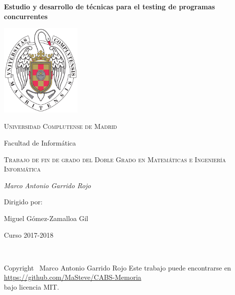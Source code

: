 \begin{titlepage}
  \centering
  \vspace{5cm}
  {\huge\bfseries Estudio y desarrollo de técnicas para el testing de programas concurrentes\par}
  \vspace{2cm}
  \includegraphics[width=0.30\textwidth]{escudoUCM}\par\vspace{1cm}
  {\scshape\LARGE Universidad Complutense de Madrid \par Facultad de Informática \par}
  \vspace{1cm}
   {\scshape\Large
     Trabajo de fin de grado del Doble Grado en Matemáticas e Ingeniería Informática\par}
  \vspace{1.5cm}
  {\Large\itshape Marco Antonio Garrido Rojo\par}
  \vfill
  Dirigido por:\par
  Miguel Gómez-Zamalloa Gil
  \vfill

  {\large Curso 2017-2018 \par}
\end{titlepage}

\newpage
\thispagestyle{empty}
\mbox{ }

\vskip 13cm
Copyright \textcopyright\ Marco Antonio Garrido Rojo
\vskip 1cm
Este trabajo puede encontrarse en\\
\url{https://github.com/MaSteve/CABS-Memoria}\\
bajo licencia MIT.
